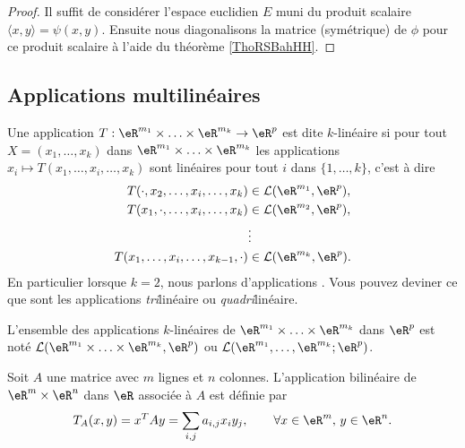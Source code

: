 \begin{proof}
    Il suffit de considérer l'espace euclidien \( E\) muni du produit scalaire \( \langle x, y\rangle =\psi(x,y)\). Ensuite nous diagonalisons la matrice (symétrique) de \( \phi\) pour ce produit scalaire à l'aide du théorème \ref{ThoRSBahHH}.
\end{proof}


\subsection{Applications multilinéaires}

\begin{definition}
 	Une application $T: \eR^{m_1}\times \ldots \times\eR^{m_k}\to\eR^p $ est dite $k$-linéaire si pour tout $X=(x_1, \ldots,x_k)$ dans $ \eR^{m_1}\times \ldots \times\eR^{m_k}$ les applications $x_i\mapsto T(x_1, \ldots, x_i,\ldots,x_k)$ sont linéaires pour tout $i$ dans $\{1,\ldots,k\}$, c'est à dire
	\begin{equation}
		\begin{aligned}[]
			T(\cdot,x_2, \ldots, x_i,\ldots,x_k)&\in \mathcal{L}(\eR^{m_1}, \eR^p),\\
			T(x_1,\cdot, \ldots, x_i,\ldots,x_k)&\in \mathcal{L}(\eR^{m_2}, \eR^p),\\
						& \vdots\\
			T(x_1, \ldots, x_i,\ldots,x_{k-1},\cdot)&\in \mathcal{L}(\eR^{m_k}, \eR^p).\\
		\end{aligned}
	\end{equation}
	En particulier lorsque $k=2$, nous parlons d'applications . Vous pouvez deviner ce que sont les applications \emph{tri}linéaire ou \emph{quadri}linéaire.
\end{definition}

L'ensemble des applications $k$-linéaires de $ \eR^{m_1}\times \ldots \times\eR^{m_k}$ dans $\eR^p$ est noté $\mathcal{L}(\eR^{m_1}\times \ldots \times\eR^{m_k}, \eR^p)$ ou $\mathcal{L}(\eR^{m_1}, \ldots,\eR^{m_k}; \eR^p)$.

\begin{example}
  Soit $A$ une matrice avec $m$ lignes et $n$ colonnes. L'application bilinéaire de $\eR^m\times \eR^n$ dans $\eR$ associée à $A$ est définie par
\[
T_A(x,y)= x^TAy=\sum_{i,j}a_{i,j}x_i y_j, \qquad \forall x\in \eR^m, \, y \in \eR^n.
\]
\end{example}

